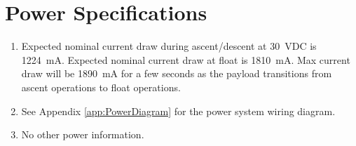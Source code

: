 \newpage
\section{Power Specifications}
\label{sec:Power}

\hspace*{0.5cm}
\begin{minipage}{\linewidth-0.5cm}
  \begin{enumerate}[label=\Alph*.]
  \item Expected nominal current draw during ascent/descent at \SI{30}{\volt}DC is \SI{1224}{\milli\ampere}. Expected nominal current draw at float is \SI{1810}{\milli\ampere}. Max current draw will be \SI{1890}{\milli\ampere} for a few seconds as the payload transitions from ascent operations to float operations.  
  \item See Appendix \ref{app:PowerDiagram} for the power system wiring diagram.  
  \item No other power information. 
  \end{enumerate}
\end{minipage}
